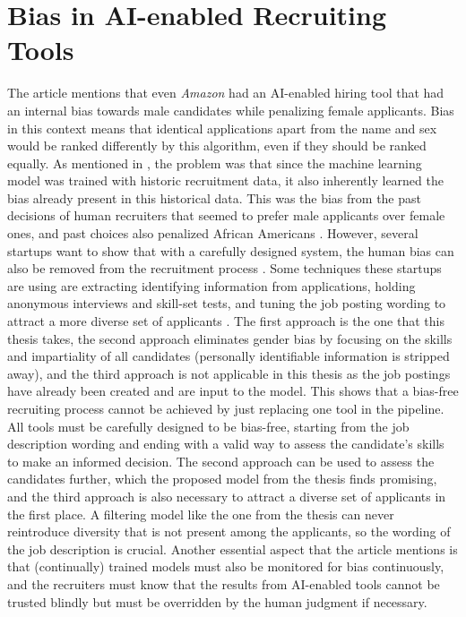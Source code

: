\documentclass[draft,final]{thesisclass} %
\begin{document}
\section{Bias in \acs{AI}-enabled Recruiting Tools}
The article \textcite[9]{bias_ai_hiring} mentions that even \textit{Amazon} had an \acs{AI}-enabled hiring tool that had an internal bias towards male candidates while penalizing female applicants.
Bias in this context means that identical applications apart from the name and sex would be ranked differently by this algorithm, even if they should be ranked equally.
As mentioned in \textcite[9]{bias_ai_hiring}, the problem was that since the machine learning model was trained with historic recruitment data, it also inherently learned the bias already present in this historical data.
This was the bias from the past decisions of human recruiters that seemed to prefer male applicants over female ones, and past choices also penalized African Americans \parencite[9-10]{bias_ai_hiring}.
However, several startups want to show that with a carefully designed system, the human bias can also be removed from the recruitment process \parencite[9]{bias_ai_hiring}.
Some techniques these startups are using are extracting identifying information from applications, holding anonymous interviews and skill-set tests, and tuning the job posting wording to attract a more diverse set of applicants \parencite[9]{bias_ai_hiring}.
The first approach is the one that this thesis takes, the second approach eliminates gender bias by focusing on the skills and impartiality of all candidates (personally identifiable information is stripped away), and the third approach is not applicable in this thesis as the job postings have already been created and are input to the model.
This shows that a bias-free recruiting process cannot be achieved by just replacing one tool in the pipeline. All tools must be carefully designed to be bias-free, starting from the job description wording and ending with a valid way to assess the candidate's skills to make an informed decision.
The second approach can be used to assess the candidates further, which the proposed model from the thesis finds promising, and the third approach is also necessary to attract a diverse set of applicants in the first place.
A filtering model like the one from the thesis can never reintroduce diversity that is not present among the applicants, so the wording of the job description is crucial.
Another essential aspect that the article \textcite[9-10]{bias_ai_hiring} mentions is that (continually) trained models must also be monitored for bias continuously, and the recruiters must know that the results from \acs{AI}-enabled tools cannot be trusted blindly but must be overridden by the human judgment if necessary.
\end{document}
